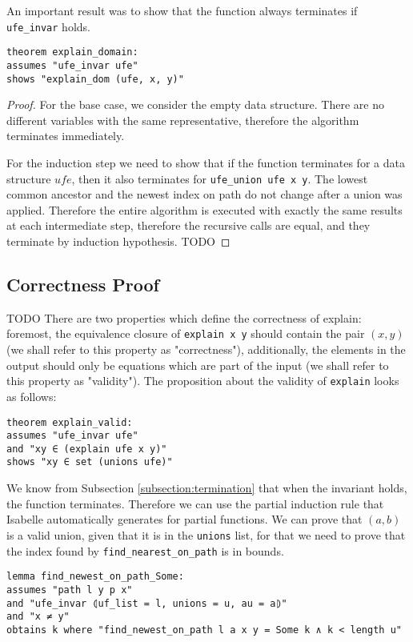 An important result was to show that the function always terminates if \lstinline{ufe_invar} holds.

\begin{lstlisting}
theorem explain_domain:
assumes "ufe_invar ufe"
shows "explain_dom (ufe, x, y)"
\end{lstlisting}
	
\begin{proof}
For the base case, we consider the empty data structure. There are no different variables with the same representative, therefore the algorithm terminates immediately.
 
For the induction step we need to show that if the function terminates for a data structure $ufe$, then it also terminates for \lstinline{ufe_union ufe x y}. 
The lowest common ancestor and the newest index on path do not change after a union was applied. Therefore the entire algorithm is executed with exactly the same results at each intermediate step, therefore the recursive calls are equal, and they terminate by induction hypothesis.
TODO
\end{proof}

\subsection{Correctness Proof}
TODO
There are two properties which define the correctness of explain: foremost, the equivalence closure of \lstinline{explain x y} should contain the pair $(x, y)$ (we shall refer to this property as "correctness"), additionally, the elements in the output should only be equations which are part of the input (we shall refer to this property as "validity"). The proposition about the validity of \lstinline{explain} looks as follows:

\begin{lstlisting}
theorem explain_valid:
assumes "ufe_invar ufe"
and "xy ∈ (explain ufe x y)"
shows "xy ∈ set (unions ufe)"
\end{lstlisting}

We know from Subsection \ref{subsection:termination} that when the invariant holds, the function terminates. Therefore we can use the partial induction rule that Isabelle automatically generates for partial functions. We can prove that $(a, b)$ is a valid union, given that it is in the \lstinline{unions} list, for that we need to prove that the index found by \lstinline{find_nearest_on_path} is in bounds.

\begin{lstlisting}
lemma find_newest_on_path_Some:
assumes "path l y p x"
and "ufe_invar ⦇uf_list = l, unions = u, au = a⦈"
and "x ≠ y"
obtains k where "find_newest_on_path l a x y = Some k ∧ k < length u"
\end{lstlisting}

